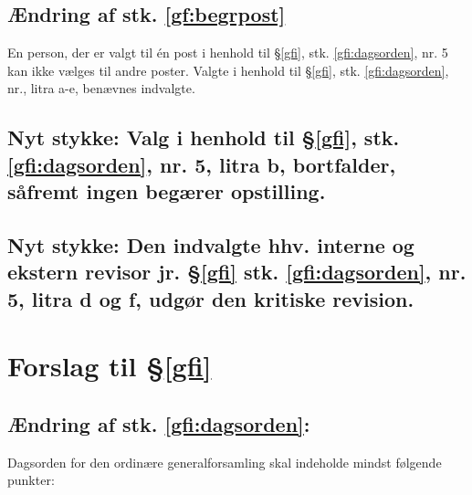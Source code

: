 \subsection*{Ændring af stk. \ref{gf:begrpost}}
En person, der er valgt til én post i henhold til §\ref{gfi}, stk. \ref{gfi:dagsorden}, nr. 5 kan ikke vælges til andre poster. Valgte i henhold til §\ref{gfi}, stk. \ref{gfi:dagsorden}, nr., litra a-e, benævnes indvalgte.

\subsection*{Nyt stykke: Valg i henhold til §\ref{gfi}, stk. \ref{gfi:dagsorden}, nr. 5, litra b, bortfalder, såfremt ingen begærer opstilling.}

\subsection*{Nyt stykke: Den indvalgte hhv. interne og ekstern revisor jr. §\ref{gfi} stk. \ref{gfi:dagsorden}, nr. 5, litra d og f, udgør den kritiske revision.}

\section*{Forslag til §\ref{gfi}}

\subsection*{Ændring af stk. \ref{gfi:dagsorden}:\newline}

Dagsorden for den ordinære generalforsamling skal indeholde mindst følgende punkter:

